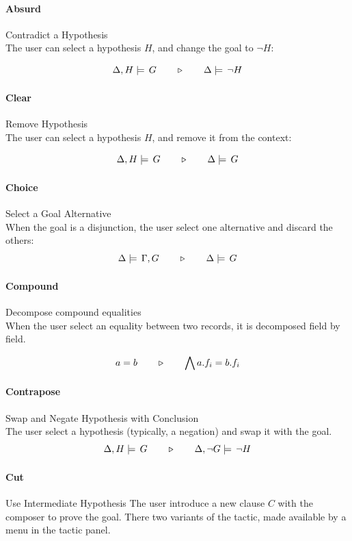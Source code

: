 \paragraph{Absurd} Contradict a Hypothesis\\
The user can select a hypothesis $H$, and change the goal to $\neg H$:

$$ \Delta,H\models\,G\quad\quad\triangleright\quad\quad\Delta\models\,\neg H $$

\paragraph{Clear} Remove Hypothesis\\
The user can select a hypothesis $H$, and remove it from the context:

$$ \Delta,H\models\,G\quad\quad\triangleright\quad\quad\Delta\models\,G $$

\paragraph{Choice} Select a Goal Alternative\\
When the goal is a disjunction, the user select one alternative and discard the others:
$$ \Delta\models\,\Gamma,G\quad\quad\triangleright\quad\quad\Delta\models\,G $$

\paragraph{Compound} Decompose compound equalities\\
When the user select an equality between two records, it is decomposed field by field.

$$ a = b \quad\quad\triangleright\quad\quad \bigwedge a.f_i = b.f_i $$

\paragraph{Contrapose} Swap and Negate Hypothesis with Conclusion\\
The user select a hypothesis (typically, a negation) and swap it with the goal.
$$ \Delta,H\models\,G\quad\quad\triangleright\quad\quad\Delta,\neg G\models\,\neg H $$

\paragraph{Cut} Use Intermediate Hypothesis
The user introduce a new clause $C$ with the composer to prove the goal. There two variants of the tactic, made available by a menu in the tactic panel.

